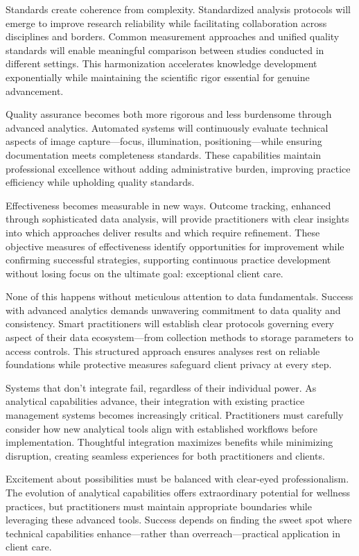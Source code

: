 \documentclass[
  Letterpaper,
]{scrbook}
\begin{document}
Standards create coherence from complexity. Standardized analysis
protocols will emerge to improve research reliability while facilitating
collaboration across disciplines and borders. Common measurement
approaches and unified quality standards will enable meaningful
comparison between studies conducted in different settings. This
harmonization accelerates knowledge development exponentially while
maintaining the scientific rigor essential for genuine advancement.

Quality assurance becomes both more rigorous and less burdensome through
advanced analytics. Automated systems will continuously evaluate
technical aspects of image capture---focus, illumination,
positioning---while ensuring documentation meets completeness standards.
These capabilities maintain professional excellence without adding
administrative burden, improving practice efficiency while upholding
quality standards.

Effectiveness becomes measurable in new ways. Outcome tracking, enhanced
through sophisticated data analysis, will provide practitioners with
clear insights into which approaches deliver results and which require
refinement. These objective measures of effectiveness identify
opportunities for improvement while confirming successful strategies,
supporting continuous practice development without losing focus on the
ultimate goal: exceptional client care.

None of this happens without meticulous attention to data fundamentals.
Success with advanced analytics demands unwavering commitment to data
quality and consistency. Smart practitioners will establish clear
protocols governing every aspect of their data ecosystem---from
collection methods to storage parameters to access controls. This
structured approach ensures analyses rest on reliable foundations while
protective measures safeguard client privacy at every step.

Systems that don't integrate fail, regardless of their individual power.
As analytical capabilities advance, their integration with existing
practice management systems becomes increasingly critical. Practitioners
must carefully consider how new analytical tools align with established
workflows before implementation. Thoughtful integration maximizes
benefits while minimizing disruption, creating seamless experiences for
both practitioners and clients.

Excitement about possibilities must be balanced with clear-eyed
professionalism. The evolution of analytical capabilities offers
extraordinary potential for wellness practices, but practitioners must
maintain appropriate boundaries while leveraging these advanced tools.
Success depends on finding the sweet spot where technical capabilities
enhance---rather than overreach---practical application in client care.
\end{document}
